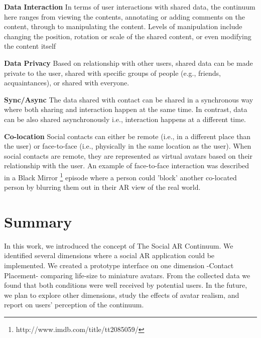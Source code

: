 \textbf{Data Interaction}
In terms of user interactions with shared data, the continuum here ranges from viewing the contents, annotating or adding comments on the content, through to manipulating the content. Levels of manipulation include changing the position, rotation or scale of the shared content, or even modifying the content itself

\textbf{Data Privacy}
Based on relationship with other users, shared data can be made private to the user, shared with specific groups of people (e.g., friends, acquaintances), or shared with everyone. 

\textbf{Sync/Async}
The data shared with contact can be shared in a synchronous way where both sharing and interaction happen at the same time. In contrast, data can be also shared asynchronously \cite{Smith2016} i.e., interaction happens at a different time. 

\textbf{Co-location}
Social contacts can either be remote (i.e., in a different place than the user) or face-to-face (i.e., physically in the same location as the user). When social contacts are remote, they are represented as virtual avatars based on their relationship with the user. An example of face-to-face interaction was described in a Black Mirror \footnote{http://www.imdb.com/title/tt2085059/} episode where a person could 'block' another co-located person by blurring them out in their AR view of the real world.

\section{Summary}

In this work, we introduced the concept of The Social AR Continuum. We identified several dimensions where a social AR application could be implemented. We created a prototype interface on one dimension -Contact Placement- comparing life-size to miniature avatars. From the collected data we found that both conditions were well received by potential users. In the future, we plan to explore other dimensions, study the effects of avatar realism, and report on users' perception of the continuum.
